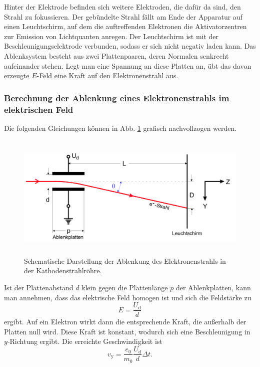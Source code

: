 \noindent Hinter der Elektrode befinden sich weitere Elektroden, 
die dafür da sind, den Strahl zu fokussieren. Der gebündelte 
Strahl fällt am Ende der Apparatur auf einen Leuchtschirm, 
auf dem die auftreffenden Elektronen die Aktivatorzentren zur 
Emission von Lichtquanten anregen.
Der Leuchtschirm ist mit der Beschleunigungselektrode 
verbunden, sodass er sich nicht negativ laden kann.
Das Ablenksystem besteht aus zwei Plattenpaaren, deren Normalen 
senkrecht aufeinander stehen. Legt man eine Spannung an diese 
Platten an, übt das davon erzeugte $E$-Feld eine Kraft 
auf den Elektronenstrahl aus. 

\subsubsection{Berechnung der Ablenkung eines Elektronenstrahls im elektrischen Feld} %
Die folgenden Gleichungen können in Abb. \ref{fig:roehre2}
grafisch nachvollzogen werden.
\begin{figure}
    \centering
    \includegraphics[width=12cm, height=6cm]{build/roehre2.png}
    \caption{Schematische Darstellung der Ablenkung des
    Elektronenstrahls in der Kathodenstrahlröhre. \cite{V501}}
    \label{fig:roehre2}
\end{figure}

\noindent Ist der Plattenabstand $d$ klein gegen die Plattenlänge $p$ 
der Ablenkplatten, kann man annehmen, dass das elektrische 
Feld homogen ist und sich die Feldstärke zu
\begin{equation*}
    E = \frac{U_\text{d}}{d}
\end{equation*} 
ergibt. Auf ein Elektron wirkt dann die entsprechende Kraft, 
die außerhalb der Platten null wird. Diese Kraft ist konstant, 
wodurch sich eine Beschleunigung in $y$-Richtung  
ergibt. 
Die erreichte Geschwindigkeit ist 
\begin{equation*}
    v_\text{y} = \frac{e_\text{0}}{m_\text{0}} \frac{U_\text{d}}{d} \Delta t.
\end{equation*}


